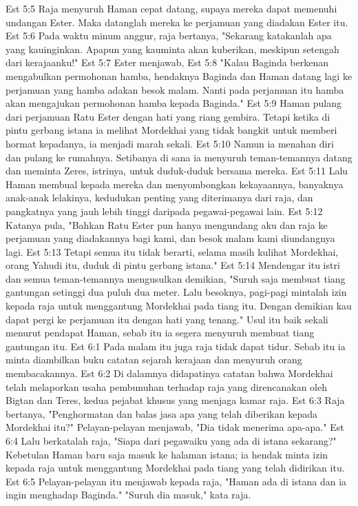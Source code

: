 Est 5:5  Raja menyuruh Haman cepat datang, supaya mereka dapat memenuhi undangan Ester. Maka datanglah mereka ke perjamuan yang diadakan Ester itu.
Est 5:6  Pada waktu minum anggur, raja bertanya, "Sekarang katakanlah apa yang kauinginkan. Apapun yang kauminta akan kuberikan, meskipun setengah dari kerajaanku!"
Est 5:7  Ester menjawab,
Est 5:8  "Kalau Baginda berkenan mengabulkan permohonan hamba, hendaknya Baginda dan Haman datang lagi ke perjamuan yang hamba adakan besok malam. Nanti pada perjamuan itu hamba akan mengajukan permohonan hamba kepada Baginda."
Est 5:9  Haman pulang dari perjamuan Ratu Ester dengan hati yang riang gembira. Tetapi ketika di pintu gerbang istana ia melihat Mordekhai yang tidak bangkit untuk memberi hormat kepadanya, ia menjadi marah sekali.
Est 5:10  Namun ia menahan diri dan pulang ke rumahnya. Setibanya di sana ia menyuruh teman-temannya datang dan meminta Zeres, istrinya, untuk duduk-duduk bersama mereka.
Est 5:11  Lalu Haman membual kepada mereka dan menyombongkan kekayaannya, banyaknya anak-anak lelakinya, kedudukan penting yang diterimanya dari raja, dan pangkatnya yang jauh lebih tinggi daripada pegawai-pegawai lain.
Est 5:12  Katanya pula, "Bahkan Ratu Ester pun hanya mengundang aku dan raja ke perjamuan yang diadakannya bagi kami, dan besok malam kami diundangnya lagi.
Est 5:13  Tetapi semua itu tidak berarti, selama masih kulihat Mordekhai, orang Yahudi itu, duduk di pintu gerbang istana."
Est 5:14  Mendengar itu istri dan semua teman-temannya mengusulkan demikian, "Suruh saja membuat tiang gantungan setinggi dua puluh dua meter. Lalu besoknya, pagi-pagi mintalah izin kepada raja untuk menggantung Mordekhai pada tiang itu. Dengan demikian kau dapat pergi ke perjamuan itu dengan hati yang tenang." Usul itu baik sekali menurut pendapat Haman, sebab itu ia segera menyuruh membuat tiang gantungan itu.
Est 6:1  Pada malam itu juga raja tidak dapat tidur. Sebab itu ia minta diambilkan buku catatan sejarah kerajaan dan menyuruh orang membacakannya.
Est 6:2  Di dalamnya didapatinya catatan bahwa Mordekhai telah melaporkan usaha pembunuhan terhadap raja yang direncanakan oleh Bigtan dan Teres, kedua pejabat khusus yang menjaga kamar raja.
Est 6:3  Raja bertanya, "Penghormatan dan balas jasa apa yang telah diberikan kepada Mordekhai itu?" Pelayan-pelayan menjawab, "Dia tidak menerima apa-apa."
Est 6:4  Lalu berkatalah raja, "Siapa dari pegawaiku yang ada di istana sekarang?" Kebetulan Haman baru saja masuk ke halaman istana; ia hendak minta izin kepada raja untuk menggantung Mordekhai pada tiang yang telah didirikan itu.
Est 6:5  Pelayan-pelayan itu menjawab kepada raja, "Haman ada di istana dan ia ingin menghadap Baginda." "Suruh dia masuk," kata raja.
